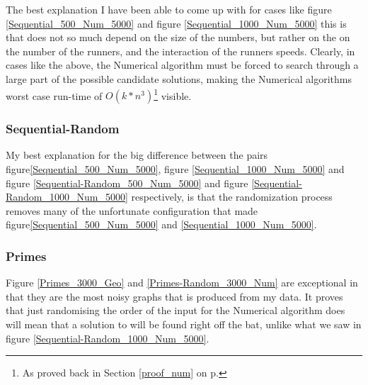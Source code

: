 
The best explanation I have been able to come up with for cases like figure \ref{Sequential_500_Num_5000} and figure \ref{Sequential_1000_Num_5000} this is that  does not so much depend on the size of the numbers, but rather on the on the number of the runners, and the interaction of the runners speeds. Clearly, in cases like the above, the Numerical algorithm must be forced to search through a large part of the possible candidate solutions, making the Numerical algorithms worst case run-time of $O(k * n^3)$\footnote{As proved back in Section \ref{proof_num} on p. \pageref{proof_num}} visible.

\subsubsection{Sequential-Random}

My best explanation for the big difference between the pairs figure\ref{Sequential_500_Num_5000}, figure \ref{Sequential_1000_Num_5000} and figure \ref{Sequential-Random_500_Num_5000} and figure \ref{Sequential-Random_1000_Num_5000} respectively, is that the randomization process removes many of the unfortunate configuration that made figure\ref{Sequential_500_Num_5000} and \ref{Sequential_1000_Num_5000}.

\subsubsection{Primes}

Figure \ref{Primes_3000_Geo} and \ref{Primes-Random_3000_Num} are exceptional in that they are the most noisy graphs that is produced from my data. It proves that just randomising the order of the input for the Numerical algorithm does will mean that a solution to  will be found right off the bat, unlike what we saw in figure \ref{Sequential-Random_1000_Num_5000}.  



